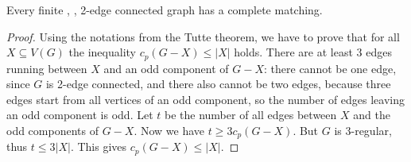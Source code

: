 \documentclass[12pt]{article}
\begin{document}
Every finite , , 2-edge connected graph has a complete matching.

\begin{proof}
Using the notations from the Tutte theorem, we have to prove that for all $X\subseteq V(G)$ the inequality $c_p(G-X)\leq |X|$ holds. There are at least $3$ edges running between $X$ and an odd component of $G-X$: there cannot be one edge, since $G$ is 2-edge connected, and there also cannot be two edges, because three edges start from all vertices of an odd component, so the number of edges leaving an odd component is odd. Let $t$ be the number of all edges between $X$ and the odd components of $G-X$. Now we have $t\geq 3c_p(G-X)$. But $G$ is 3-regular, thus $t\leq 3|X|$. This  gives $c_p(G-X)\leq |X|$.
\end{proof}
\end{document}
